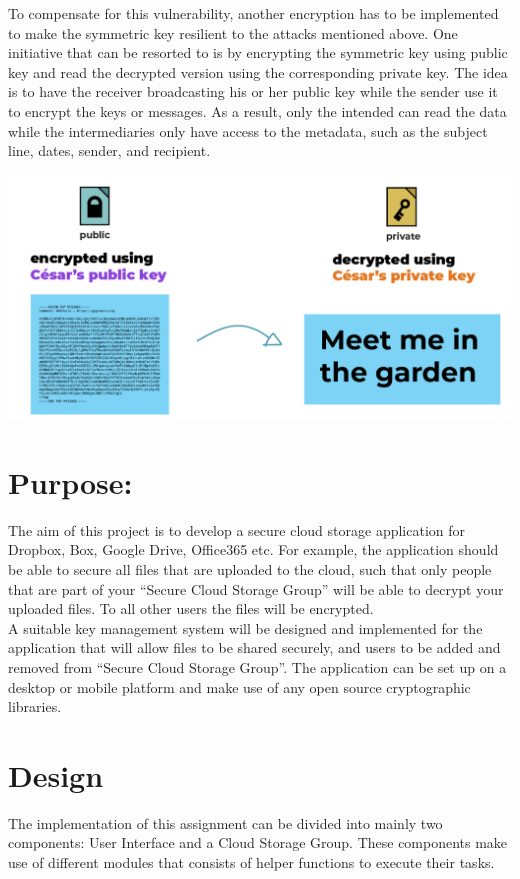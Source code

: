 \documentclass[12pt]{article}
\begin{document}
To compensate for this vulnerability, another encryption has to be implemented to make the symmetric key resilient to the attacks mentioned above. One initiative that can be resorted to is by encrypting the symmetric key using public key and read the decrypted version using the corresponding private key. The idea is to have the receiver broadcasting his or her public key while the sender use it to encrypt the keys or messages. As a result, only the intended can read the data while the intermediaries only have access to the metadata, such as the subject line, dates, sender, and recipient.\\

\begin{center}
\includegraphics[scale=0.5]{proper}
\end{center}
\newpage
\section*{Purpose:}
The aim of this project is to develop a secure cloud storage application for Dropbox, Box, Google Drive, Office365 etc. For example, the application should be able to secure all files that are uploaded to the cloud, such that only people that are part of your “Secure Cloud Storage Group” will be able to decrypt your uploaded files. To all other users the files will be encrypted. \\ 

A suitable key management system will be designed and implemented for the application that will allow files to be shared securely, and users to be added and removed from “Secure Cloud Storage Group”. The application can be set up on a desktop or mobile platform and make use of any open source cryptographic libraries.
\section*{Design}
The implementation of this assignment can be divided into mainly two components: User Interface and a Cloud Storage Group. These components make use of different modules that consists of helper functions to execute their tasks. \\
\end{document}
